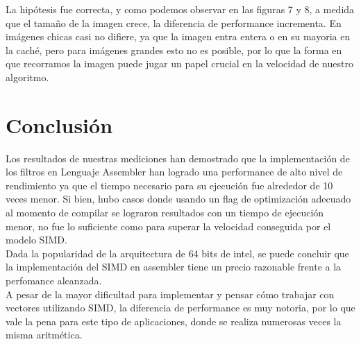 \documentclass[10pt,a4paper,spanish]{article}
\begin{document}
La hipótesis fue correcta, y como podemos observar en las figuras 7 y 8, a medida que el tamaño de la imagen crece, la diferencia de performance incrementa. En imágenes chicas casi no difiere, ya que la imagen entra entera o en su mayoria en la caché, pero para imágenes grandes esto no es posible, por lo que la forma en que recorramos la imagen puede jugar un papel crucial en la velocidad de nuestro algoritmo.

\section{Conclusión}

Los resultados de nuestras mediciones han demostrado que la implementación de los filtros en Lenguaje Assembler han logrado una performance de alto nivel de rendimiento ya que el tiempo necesario para su ejecución fue alrededor de 10 veces menor. Si bien, hubo casos donde usando un flag de optimización adecuado al momento de compilar se lograron resultados con un tiempo de ejecución menor, no fue lo suficiente como para superar la velocidad conseguida por el modelo SIMD. \\

Dada la popularidad de la arquitectura de 64 bits de intel, se puede concluir que la implementación del SIMD en assembler tiene un precio razonable frente a la perfomance alcanzada.\\

A pesar de la mayor dificultad para implementar y pensar cómo trabajar con vectores utilizando SIMD, la diferencia de performance es muy notoria, por lo que vale la pena para este tipo de aplicaciones, donde se realiza numerosas veces la misma aritmética.





\end{document}
